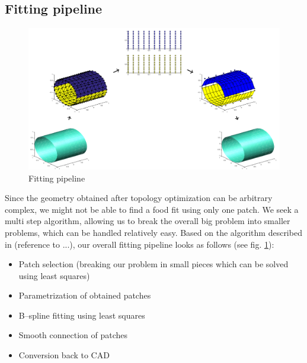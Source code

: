 \subsection{Fitting pipeline}
\begin{figure}
  \includegraphics[width=.85\linewidth]{Fitting_workflow.png}
  \caption{Fitting pipeline}
  \label{fig:fitting_pipeline}
\end{figure}
Since the geometry obtained after topology optimization can be arbitrary complex, we might not be able to find a food fit using only one patch. We seek a multi step algorithm, allowing us to break the overall big problem into smaller problems, which can be handled relatively easy.
Based on the algorithm described in (reference to ...), our overall fitting pipeline looks as follows (see fig. \ref{fig:fitting_pipeline}):
\begin{itemize}
	\item Patch selection (breaking our problem in small pieces which can be solved using least squares)
	\item Parametrization of obtained patches
	\item B--spline fitting using least squares
	\item Smooth connection of patches
	\item Conversion back to CAD
\end{itemize}



